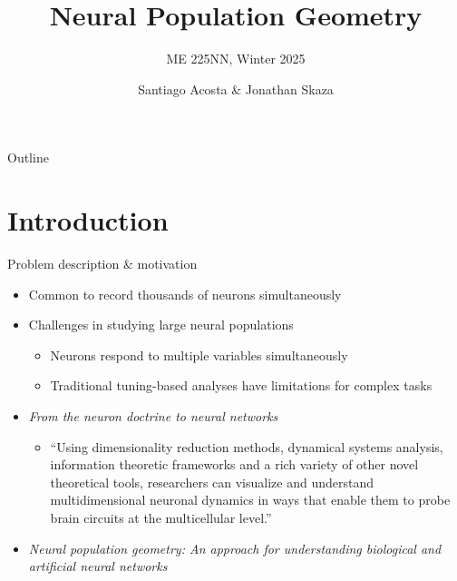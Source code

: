 \documentclass[aspectratio=169]{beamer}
\title[Neural Population Geometry]{Neural Population Geometry}
\subtitle{ME 225NN, Winter 2025}
\author[Acosta \& Skaza]{Santiago Acosta \& Jonathan Skaza}
\institute[UCSB]{Dynamical Neuroscience Graduate Program\\University of California, Santa Barbara}
\date{}
\begin{document}
\begin{frame}
    \titlepage
\end{frame}

\begin{frame}{Outline}
    \tableofcontents
\end{frame}

\section{Introduction}

\begin{frame}{Problem description \& motivation}
    \begin{itemize}
        \item Common to record thousands of neurons simultaneously
        \item Challenges in studying large neural populations
        \begin{itemize}
            \item Neurons respond to multiple variables simultaneously
            \item Traditional tuning-based analyses have limitations for complex tasks
        \end{itemize}
        \item \textit{From the neuron doctrine to neural networks} \cite{yuste2015neuron}
        \begin{itemize}
            \item ``Using dimensionality reduction methods, dynamical systems analysis, information theoretic frameworks and a rich variety of other novel theoretical tools, researchers can visualize and understand multidimensional neuronal dynamics in ways that enable them to probe brain circuits at the multicellular level.''
        \end{itemize}
        \item \textit{Neural population geometry: An approach for understanding biological and artificial neural networks} \cite{chung2021neural}
    \end{itemize}
\end{frame}
\end{document}
